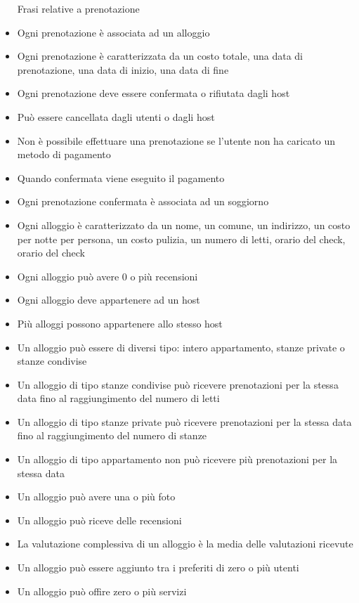 \documentclass[letterpaper]{report}
\begin{document}
\begin{itemize} Frasi relative a prenotazione
\item Ogni prenotazione è associata ad un alloggio
\item Ogni prenotazione è caratterizzata da un costo totale, una data di prenotazione, una data di inizio, una data di fine
\item Ogni prenotazione deve essere confermata o rifiutata dagli host
\item Può essere cancellata dagli utenti o dagli host
\item Non è possibile effettuare una prenotazione se l'utente non ha caricato un metodo di pagamento
\item Quando confermata viene eseguito il pagamento
\item Ogni prenotazione confermata è associata ad un soggiorno

\end{itemize}
\begin{itemize} Frasi relative a Alloggio
\item Ogni alloggio è caratterizzato da un nome, un comune, un indirizzo, un costo per notte per persona, un costo pulizia, un numero di letti, orario del check\itemin, orario del check\itemout
\item Ogni alloggio può avere 0 o più recensioni
\item Ogni alloggio deve appartenere ad un host
\item Più alloggi possono appartenere allo stesso host
\item Un alloggio può essere di diversi tipo: intero appartamento, stanze private o stanze condivise
\item Un alloggio di tipo stanze condivise può ricevere prenotazioni per la stessa data fino al raggiungimento del numero di letti
\item Un alloggio di tipo stanze private può ricevere prenotazioni per la stessa data fino al raggiungimento del numero di stanze
\item Un alloggio di tipo appartamento non può ricevere più prenotazioni per la stessa data
\item Un alloggio può avere una o più foto
\item Un alloggio può riceve delle recensioni
\item La valutazione complessiva di un alloggio è la media delle valutazioni ricevute
\item Un alloggio può essere aggiunto tra i preferiti di zero o più utenti
\item Un alloggio può offire zero o più servizi
\end{itemize}
\end{document}
